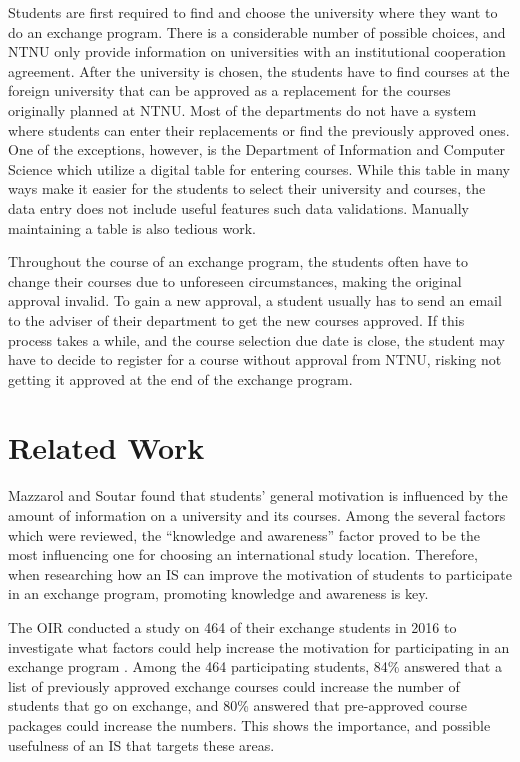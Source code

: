 Students are first required to find and choose the university where they want to do an exchange program. There is a considerable number of possible choices, and NTNU only provide information on universities with an institutional cooperation agreement. After the university is chosen, the students have to find courses at the foreign university that can be approved as a replacement for the courses originally planned at NTNU. Most of the departments do not have a system where students can enter their replacements or find the previously approved ones. One of the exceptions, however, is the Department of Information and Computer Science which utilize a digital table for entering courses. While this table in many ways make it easier for the students to select their university and courses, the data entry does not include useful features such data validations. Manually maintaining a table is also tedious work. 

Throughout the course of an exchange program, the students often have to change their courses due to unforeseen circumstances, making the original approval invalid. To gain a new approval, a student usually has to send an email to the adviser of their department to get the new courses approved. If this process takes a while, and the course selection due date is close, the student may have to decide to register for a course without approval from NTNU, risking not getting it approved at the end of the exchange program.

\section{Related Work} \label{related_work}

Mazzarol and Soutar \cite{mazzarol2002push} found that students' general motivation is influenced by the amount of information on a university and its courses. Among the several factors which were reviewed, the \enquote{knowledge and awareness} factor proved to be the most influencing one for choosing an international study location. Therefore, when researching how an IS can improve the motivation of students to participate in an exchange program, promoting knowledge and awareness is key. 

The OIR conducted a study on 464 of their exchange students in 2016 to investigate what factors could help increase the motivation for participating in an exchange program \cite{intersek_report}. Among the 464 participating students, 84\% answered that a list of previously approved exchange courses could increase the number of students that go on exchange, and 80\% answered that pre-approved course packages could increase the numbers. This shows the importance, and possible usefulness of an IS that targets these areas.  

